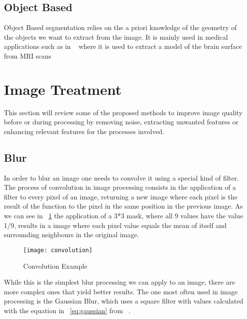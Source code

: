 \subsection{Object Based}

Object Based segmentation relies on the a priori knowledge of the geometry of the objects we want to extract from the image. It is mainly used in medical applications such as in ~\cite{snell_model-based_1993} where it is used to extract a model of the brain surface from MRI scans 

\section{Image Treatment}

This section will review some of the proposed methods to improve image quality before or during processing by removing noise, extracting unwanted features or enhancing relevant features for the processes involved.

\subsection{Blur}

In order to blur an image one needs to convolve it using a special kind of filter. The process of convolution in image processing consists in the application of a filter to every pixel of an image, returning a new image where each pixel is the result of the function to the pixel in the same position in the previous image. As we can see in ~\ref{fig:convolution} the application of a 3*3 mask, where all 9 values have the value 1/9, results in a image where each pixel value equals the mean of itself and surrounding neighbours in the original image.

\begin{figure}[h]
  \begin{center}
    \leavevmode
    \texttt{[image: convolution]}
    \caption{Convolution Example ~\cite{labs_theory_2017}}
    \label{fig:convolution}
  \end{center}
\end{figure}

While this is the simplest blur processing we can apply to an image, there are more complex ones that yield better results. The one most often used in image processing is the Gaussian Blur, which uses a square filter with values calculated with the equation in ~\ref{eq:gaussian} from ~\cite{shapiro_computer_2001}.

